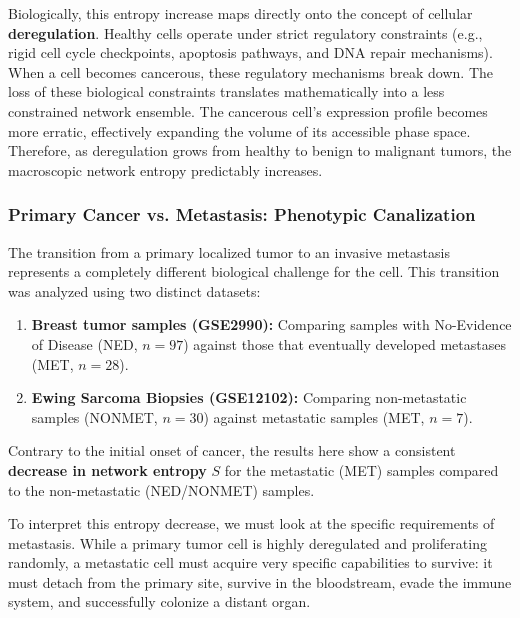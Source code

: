 Biologically, this entropy increase maps directly onto the concept of cellular \textbf{deregulation}. Healthy cells operate under strict regulatory constraints (e.g., rigid cell cycle checkpoints, apoptosis pathways, and DNA repair mechanisms). When a cell becomes cancerous, these regulatory mechanisms break down. The loss of these biological constraints translates mathematically into a less constrained network ensemble. The cancerous cell's expression profile becomes more erratic, effectively expanding the volume of its accessible phase space. Therefore, as deregulation grows from healthy to benign to malignant tumors, the macroscopic network entropy predictably increases.

\subsubsection{Primary Cancer vs. Metastasis: Phenotypic Canalization}
\label{subsubsec:cancer_vs_metastasis}

The transition from a primary localized tumor to an invasive metastasis represents a completely different biological challenge for the cell. This transition was analyzed using two distinct datasets:
\begin{enumerate}
    \item \textbf{Breast tumor samples (GSE2990):} Comparing samples with No-Evidence of Disease (NED, \(n=97\)) against those that eventually developed metastases (MET, \(n=28\)).
    \item \textbf{Ewing Sarcoma Biopsies (GSE12102):} Comparing non-metastatic samples (NONMET, \(n=30\)) against metastatic samples (MET, \(n=7\)).
\end{enumerate}

Contrary to the initial onset of cancer, the results here show a consistent \textbf{decrease in network entropy} \(S\) for the metastatic (MET) samples compared to the non-metastatic (NED/NONMET) samples.


To interpret this entropy decrease, we must look at the specific requirements of metastasis. While a primary tumor cell is highly deregulated and proliferating randomly, a metastatic cell must acquire very specific capabilities to survive: it must detach from the primary site, survive in the bloodstream, evade the immune system, and successfully colonize a distant organ.

